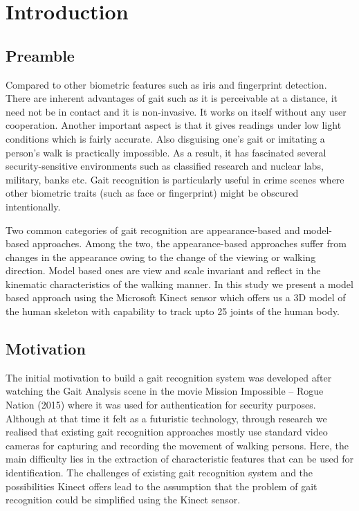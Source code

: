 \chapter{Introduction} \label{Introduction}

\section{Preamble} \label{Preamble}
\noindent Compared to other biometric features such as iris and fingerprint detection. There are inherent advantages of gait such as it is perceivable at a distance, it need not be in contact and it is non-invasive. It works on itself without any user cooperation. Another important aspect is that it gives readings under low light conditions which is fairly accurate. Also disguising one’s gait or imitating a person’s walk is practically impossible. As a result, it has fascinated several security-sensitive environments such as classified research and nuclear labs, military, banks etc. Gait recognition is particularly useful in crime scenes where other biometric traits (such as face or fingerprint) might be obscured intentionally. 

\noindent Two common categories of gait recognition are appearance-based and model-based approaches. Among the two, the appearance-based approaches suffer from changes in the appearance owing to the change of the viewing or walking direction. Model based ones are view and scale invariant and reflect in the kinematic characteristics of the walking manner. In this study we present a model based approach using the Microsoft Kinect sensor which offers us a 3D model of the human skeleton with capability to track upto 25 joints of the human body.
\newpage 
\section{Motivation}\label{Motivation}
\noindent The initial motivation to build a gait recognition system was developed after watching the Gait Analysis scene in the movie Mission Impossible – Rogue Nation (2015) where it was used for authentication for security purposes. Although at that time it felt as a futuristic technology, through research we realised that existing gait recognition approaches mostly use standard video cameras for capturing and recording the movement of walking persons. Here, the main difficulty lies in the extraction of characteristic features that can be used for identification. The challenges of existing gait recognition system and the possibilities Kinect offers lead to the assumption that the problem of gait recognition could be simplified using the Kinect sensor.
\newpage


